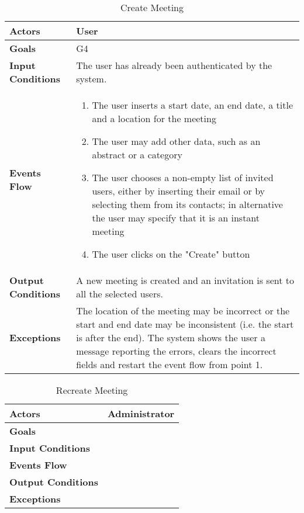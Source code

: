 \begin{table}[H]
	\centering
	\def\arraystretch{1.5}
	\begin{tabular}{|p{7cm}|p{7cm}|}
		\hline
		\textbf{Actors}            & User		    \\ \hline
		\textbf{Goals}             & G4           \\ \hline
		\textbf{Input Conditions}  & The user has already been authenticated by the system.           \\ \hline
		\textbf{Events Flow}       & 
			\begin{enumerate}[topsep=0pt, leftmargin=*]
				\item The user inserts a start date, an end date, a title and a location for the meeting
				\item The user may add other data, such as an abstract or a category
				\item The user chooses a non-empty list of invited users, either by inserting their email or by selecting them from its contacts; in alternative the user may specify that it is an instant meeting
				\item The user clicks on the "Create" button
			\end{enumerate}               \\ \hline
		\textbf{Output Conditions} & A new meeting is created and an invitation is sent to all the selected users.           \\ \hline
		\textbf{Exceptions}        & The location of the meeting may be incorrect or the start and end date may be inconsistent (i.e. the start is after the end). The system shows the user a message reporting the errors, clears the incorrect fields and restart the event flow from point 1.          \\ \hline
	\end{tabular}
	\caption{Create Meeting}
\end{table}

\begin{table}[H]
	\centering
	\def\arraystretch{1.5}
	\begin{tabular}{|p{7cm}|p{7cm}|}
		\hline
		\textbf{Actors}            & Administrator    \\ \hline
		\textbf{Goals}             &            \\ \hline
		\textbf{Input Conditions}  &            \\ \hline
		\textbf{Events Flow}       &            \\ \hline
		\textbf{Output Conditions} &            \\ \hline
		\textbf{Exceptions}        &            \\ \hline
	\end{tabular}
	\caption{Recreate Meeting}
\end{table}

